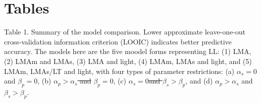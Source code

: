 \documentclass[
  12pt,
  a4paper,
,tablecaptionabove
]{scrartcl}
\providecommand{\DIFdeltex}[1]{{\protect\color{red}\sout{#1}}}                      %
\providecommand{\DIFdelbegin}{} %
\providecommand{\DIFdelend}{} %
\providecommand{\DIFdel}[1]{\texorpdfstring{\DIFdeltex{#1}}{}} %
\newcommand{\DIFscaledelfig}{0.5}
\newlength{\DIFdelgraphicswidth} %
\newlength{\DIFdelgraphicsheight} %
\newcommand{\DIFdelincludegraphics}[2][]{%
\sbox{\DIFdelgraphicsbox}{\DIFOincludegraphics[#1]{#2}}%
\settoboxwidth{\DIFdelgraphicswidth}{\DIFdelgraphicsbox} %
\settoboxtotalheight{\DIFdelgraphicsheight}{\DIFdelgraphicsbox} %
\scalebox{\DIFscaledelfig}{%
\parbox[b]{\DIFdelgraphicswidth}{\usebox{\DIFdelgraphicsbox}\\[-\baselineskip] \rule{\DIFdelgraphicswidth}{0em}}\llap{\resizebox{\DIFdelgraphicswidth}{\DIFdelgraphicsheight}{%
\setlength{\unitlength}{\DIFdelgraphicswidth}%
\begin{picture}(1,1)%
\thicklines\linethickness{2pt} %
{\color[rgb]{1,0,0}\put(0,0){\framebox(1,1){}}}%
{\color[rgb]{1,0,0}\put(0,0){\line( 1,1){1}}}%
{\color[rgb]{1,0,0}\put(0,1){\line(1,-1){1}}}%
\end{picture}%
}\hspace*{3pt}}} %
} %
\DeclareRobustCommand{\DIFdelbegin}{\DIFOdelbegin \let\includegraphics\DIFdelincludegraphics} %
\DeclareRobustCommand{\DIFdelend}{\DIFOaddend \let\includegraphics\DIFOincludegraphics} %
\begin{document}
\newpage

\hypertarget{tables}{%
\section{Tables}\label{tables}}

Table 1. Summary of the model comparison. Lower approximate
leave-one-out cross-validation information criterion (LOOIC) indicates
better predictive accuracy. The models here are the five moodel forms
representing LL: (1) LMA, (2) LMAm and LMAs, (3) LMA and light, (4)
LMAm, LMAs and light, and (5) LMAm, LMAs/LT and light, with four types
of parameter restrictions: (a) \(\alpha_s = 0\) and \(\beta_p = 0\), (b)
\DIFdelbegin \DIFdel{\(\alpha_p > \alpha_s\) and }\DIFdelend \(\beta_p = 0\), (c) \(\alpha_s = 0\)\DIFdelbegin \DIFdel{and \(\beta_s > \beta_p\)}\DIFdelend , and (d) \(\alpha_p > \alpha_s\)
and \(\beta_s > \beta_p\).
\end{document}
